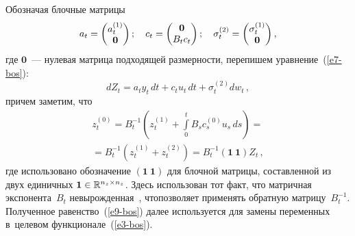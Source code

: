 \begin{multicols}{2}
     Обозначая блочные матрицы
     $$
     a_t= \begin{pmatrix} a_t^{(1)}\\ 
\mathbf{0}\end{pmatrix};\ \ \ 
c_t= \begin{pmatrix} \mathbf{0}\\ B_t 
c_t\end{pmatrix};\ \ \ \sigma_t^{(2)}\hm= \begin{pmatrix} \sigma_t^{(1)}\\ 
\mathbf{0}\end{pmatrix},
$$
 где $\mathbf{0}$~--- нулевая матрица подходящей 
размерности, перепишем уравнение~(\ref{e7-bos}):
     \begin{equation}
     dZ_t=a_t y_t \,dt +c_t u_t \,dt +\sigma_t^{(2)} dw_t\,,
     \label{e8-bos}
\end{equation}
причем заметим, что 
\begin{multline}
z_t^{(0)} =B_t^{-1}\left( z_t^{(1)} +\int\limits_0^t B_s c_s^{(0)} u_s\, ds\right) 
={}\\
{}=B_t^{-1} \left( z_t^{(1)} +z_t^{(2)}\right) =B_t^{-1}(\mathbf{1}\ \mathbf{1}) 
Z_t\,,
\label{e9-bos}
\end{multline}
где использовано обозначение $(\mathbf{1}\ \mathbf{1})$ для блочной\linebreak 
матрицы, составленной из двух единичных $\mathbf{1}\hm\in 
\mathbb{R}^{n_z\times n_z}$. Здесь использован тот факт, что мат\-рич\-ная 
экспонента~$B_t$ невырожденная~\cite{14-bos}, что\linebreak позволяет применять 
обратную мат\-ри\-цу~$B_t^{-1}$. Полученное равенство~(\ref{e9-bos}) далее 
используется для замены переменных в~целевом функционале~(\ref{e3-bos}).


\end{multicols}
